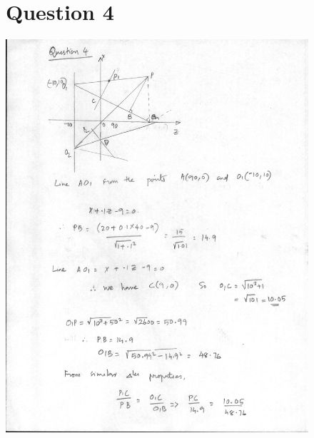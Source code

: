 \documentclass{article}
\begin{document}
\pagebreak
\begin{figure}
  \section*{Question 4}

 \includegraphics[width=15cm]{1.jpg}
\end{figure}

\pagebreak
\end{document}
